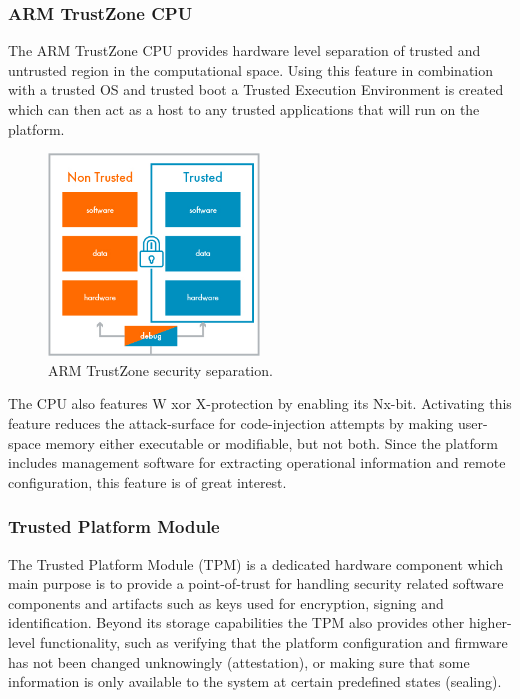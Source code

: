 \documentclass[10pt]{article}
\begin{document}
      \subsubsection{ARM TrustZone CPU}

        The ARM TrustZone CPU provides hardware level separation of trusted and
        untrusted region in the computational space. Using this feature in
        combination with a trusted OS and trusted boot a Trusted Execution
        Environment is created which can then act as a host to any trusted
        applications that will run on the platform.

        \begin{figure}[!h]
          \center
          \includegraphics[width=0.5\textwidth]{input/arm_trust.jpg}
          \caption{ARM TrustZone security separation.}
        \end{figure}

        The CPU also features W xor X-protection by enabling its Nx-bit.
        Activating this feature reduces the attack-surface for code-injection
        attempts by making user-space memory either executable or modifiable,
        but not both. Since the platform includes management software for
        extracting operational information and remote configuration, this
        feature is of great interest.

      \subsubsection{Trusted Platform Module}

        The Trusted Platform Module (TPM) is a dedicated hardware component
        which main purpose is to provide a point-of-trust for handling security
        related software components and artifacts such as keys used for
        encryption, signing and identification. Beyond its storage
        capabilities the TPM also provides other higher-level functionality,
        such as verifying that the platform configuration and firmware has not
        been changed unknowingly (attestation), or making sure that some information
        is only available to the system at certain predefined states (sealing).
\end{document}
